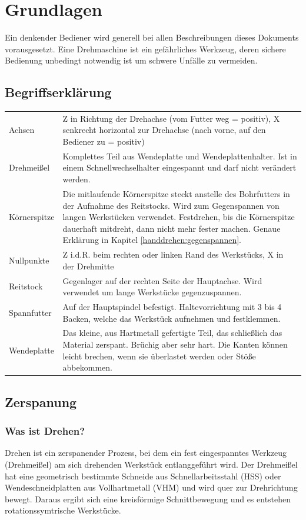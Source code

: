 \documentclass{\basedir/fablab-document}
\begin{document}
\newpage
\section{Grundlagen}

Ein denkender Bediener wird generell bei allen Beschreibungen dieses Dokuments vorausgesetzt. Eine Drehmaschine ist ein gefährliches Werkzeug, deren sichere Bedienung unbedingt notwendig ist um schwere Unfälle zu vermeiden.

\subsection{Begriffserklärung}
\begin{tabular}{p{} p{}}
Achsen 				& Z in Richtung der Drehachse (vom Futter weg = positiv), X senkrecht horizontal zur Drehachse (nach vorne, auf den Bediener zu = positiv) \\
Drehmeißel 		& Komplettes Teil aus Wendeplatte und Wendeplattenhalter. Ist in einem Schnell\-wechsel\-halter eingespannt und darf nicht verändert werden. \\
Körnerspitze 	& Die mitlaufende Körnerspitze steckt anstelle des Bohrfutters in der Aufnahme des Reitstocks. Wird zum Gegenspannen von langen Werkstücken verwendet. Festdrehen, bis die Körnerspitze dauerhaft mitdreht, dann nicht mehr fester machen. Genaue Erklärung in Kapitel \ref{handdrehen:gegenspannen}. \\
Nullpunkte 		& Z i.d.R. beim rechten oder linken Rand des Werkstücks, X in der Drehmitte \\
Reitstock 		& Gegenlager auf der rechten Seite der Hauptachse. Wird verwendet um lange Werkstücke gegenzuspannen. \\
Spannfutter 	& Auf der Hauptspindel befestigt. Haltevorrichtung mit 3 bis 4 Backen, welche das Werkstück aufnehmen und festklemmen. \\
Wendeplatte 	& Das kleine, aus Hartmetall gefertigte Teil, das schließlich das Material zerspant. Brüchig aber sehr hart. Die Kanten können leicht brechen, wenn sie überlastet werden oder Stöße abbekommen. \\
\end{tabular}

\subsection{Zerspanung}
\subsubsection{Was ist Drehen?}
Drehen ist ein zerspanender Prozess, bei dem ein fest eingespanntes Werkzeug (Drehmeißel) am sich drehenden Werkstück entlanggeführt wird.
Der Drehmeißel hat eine geometrisch bestimmte Schneide aus Schnellarbeitsstahl (HSS) oder Wendeschneidplatten aus Vollhartmetall (VHM) und wird quer zur Drehrichtung bewegt.
Daraus ergibt sich eine kreisförmige Schnittbewegung und es entstehen rotationssymtrische Werkstücke.
\end{document}
